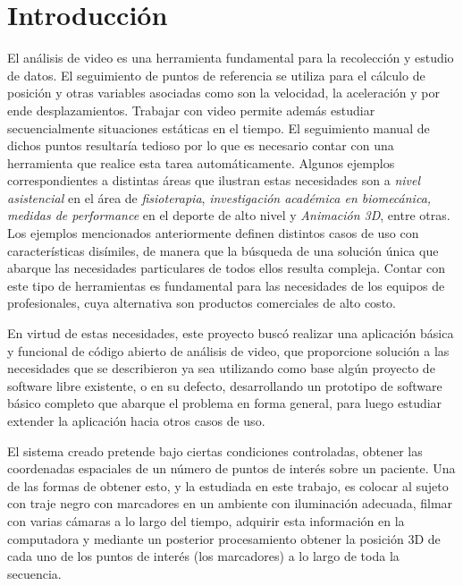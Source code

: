\section{Introducción}
El análisis de video  es  una  herramienta  fundamental para la recolección y estudio de datos. El seguimiento de puntos de referencia se utiliza para el cálculo de posición y otras variables asociadas como son la velocidad, la aceleración y por ende desplazamientos. Trabajar con video permite además estudiar secuencialmente situaciones estáticas en el tiempo. El seguimiento manual de dichos puntos resultaría tedioso por lo que es necesario contar con una herramienta que realice esta tarea automáticamente.
Algunos ejemplos correspondientes a distintas áreas que ilustran estas necesidades son a \emph{nivel asistencial} en el área de \emph{fisioterapia}, \emph{investigación académica en biomecánica,} \emph{medidas de performance} en el deporte de alto nivel y \emph{Animación 3D}, entre otras. 
Los ejemplos mencionados anteriormente definen distintos casos de uso con características disímiles, de manera que la búsqueda de una solución única que abarque las necesidades particulares de todos ellos resulta compleja. Contar con este tipo de herramientas es fundamental para las necesidades de los equipos de profesionales, cuya alternativa son productos comerciales de alto costo.

En virtud de estas necesidades, este proyecto buscó realizar una aplicación básica y funcional de código abierto de análisis de video, que proporcione solución a las necesidades que se describieron ya sea utilizando como base algún  proyecto  de  software  libre  existente, o en su defecto, desarrollando un prototipo de software básico completo que abarque el problema en forma general, para luego estudiar extender la aplicación hacia otros casos de uso.

El sistema creado pretende bajo ciertas condiciones controladas, obtener las coordenadas espaciales de un número de puntos de interés sobre un paciente. Una de las formas de obtener esto, y la estudiada en este trabajo, es colocar al sujeto con traje negro con marcadores en un ambiente con iluminación adecuada, filmar con varias cámaras a lo largo del tiempo, adquirir esta información en la computadora y mediante un posterior procesamiento obtener la posición 3D de cada uno de los puntos de interés (los marcadores) a lo largo de toda la secuencia.
